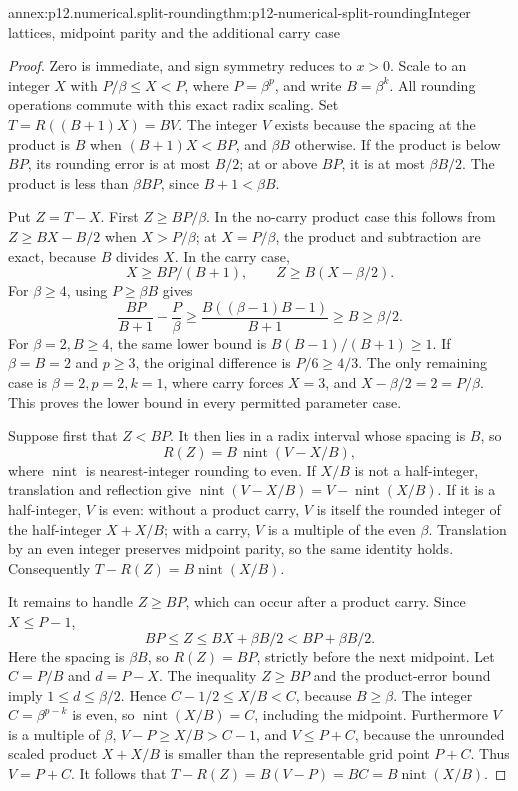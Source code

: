 \begin{annexitem}{annex:p12.numerical.split-rounding}{thm:p12-numerical-split-rounding}{Integer lattices, midpoint parity and the additional carry case}
\begin{proof}
Zero is immediate, and sign symmetry reduces to \(x>0\). Scale to
an integer \(X\) with \(P/\beta\leq X<P\), where
\(P=\beta^p\), and write \(B=\beta^k\). All rounding operations
commute with this exact radix scaling. Set
\(T=R((B+1)X)=BV\). The integer \(V\) exists because the spacing
at the product is \(B\) when \((B+1)X<BP\), and \(\beta B\)
otherwise. If the product is below \(BP\), its rounding error is
at most \(B/2\); at or above \(BP\), it is at most \(\beta B/2\).
The product is less than \(\beta BP\), since \(B+1<\beta B\).

Put \(Z=T-X\). First \(Z\geq BP/\beta\). In the no-carry
product case this follows from \(Z\geq BX-B/2\) when
\(X>P/\beta\); at \(X=P/\beta\), the product and subtraction
are exact, because \(B\) divides \(X\). In the carry case,
\[
 X\geq BP/(B+1),\qquad Z\geq B(X-\beta/2).
\]
For \(\beta\geq4\), using \(P\geq\beta B\) gives
\[
 \frac{BP}{B+1}-\frac P\beta
 \geq\frac{B((\beta-1)B-1)}{B+1}\geq B\geq\beta/2.
\]
For \(\beta=2,B\geq4\), the same lower bound is
\(B(B-1)/(B+1)\geq1\). If \(\beta=B=2\) and \(p\geq3\),
the original difference is \(P/6\geq4/3\). The only remaining
case is \(\beta=2,p=2,k=1\), where carry forces \(X=3\),
and \(X-\beta/2=2=P/\beta\). This proves the lower bound in
every permitted parameter case.

Suppose first that \(Z<BP\). It then lies in a radix interval whose
spacing is \(B\), so
\[
 R(Z)=B\,\operatorname{nint}(V-X/B),
\]
where \(\operatorname{nint}\) is nearest-integer rounding to even.
If \(X/B\) is not a half-integer, translation and reflection give
\(\operatorname{nint}(V-X/B)=V-\operatorname{nint}(X/B)\).
If it is a half-integer, \(V\) is even: without a product carry,
\(V\) is itself the rounded integer of the half-integer
\(X+X/B\); with a carry, \(V\) is a multiple of the even
\(\beta\). Translation by an even integer preserves midpoint
parity, so the same identity holds. Consequently
\(T-R(Z)=B\operatorname{nint}(X/B)\).

It remains to handle \(Z\geq BP\), which can occur after a
product carry. Since \(X\leq P-1\),
\[
 BP\leq Z\leq BX+\beta B/2<BP+\beta B/2.
\]
Here the spacing is \(\beta B\), so \(R(Z)=BP\), strictly before
the next midpoint. Let \(C=P/B\) and \(d=P-X\).
The inequality \(Z\geq BP\) and the product-error bound imply
\(1\leq d\leq\beta/2\). Hence
\(C-1/2\leq X/B<C\), because \(B\geq\beta\).
The integer \(C=\beta^{p-k}\) is even, so
\(\operatorname{nint}(X/B)=C\), including the midpoint.
Furthermore \(V\) is a multiple of \(\beta\),
\(V-P\geq X/B>C-1\), and \(V\leq P+C\), because the
unrounded scaled product \(X+X/B\) is smaller than the representable
grid point \(P+C\). Thus \(V=P+C\). It follows that
\(T-R(Z)=B(V-P)=BC=B\operatorname{nint}(X/B)\).


\end{proof}
\end{annexitem}
